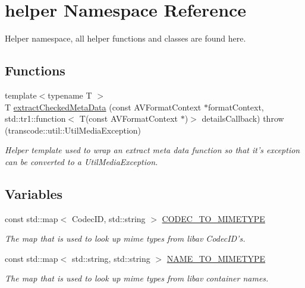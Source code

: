 \hypertarget{namespacehelper}{
\section{helper Namespace Reference}
\label{namespacehelper}
}


Helper namespace, all helper functions and classes are found here.  


\subsection*{Functions}
\begin{DoxyCompactItemize}
\item 
{\footnotesize template$<$typename T $>$ }\\T \hyperlink{namespacehelper_ac4210385b9f91f63e6a6c73cd4f15935}{extractCheckedMetaData} (const AVFormatContext $\ast$formatContext, std::tr1::function$<$ T(const AVFormatContext $\ast$)$>$ detailsCallback)  throw (transcode::util::UtilMediaException)
\begin{DoxyCompactList}\small\item\em Helper template used to wrap an extract meta data function so that it's exception can be converted to a UtilMediaException. \item\end{DoxyCompactList}\end{DoxyCompactItemize}
\subsection*{Variables}
\begin{DoxyCompactItemize}
\item 
const std::map$<$ CodecID, std::string $>$ \hyperlink{namespacehelper_af150f7275a50533efd1065e69614c1b7}{CODEC\_\-TO\_\-MIMETYPE}
\begin{DoxyCompactList}\small\item\em The map that is used to look up mime types from libav CodecID's. \item\end{DoxyCompactList}\item 
const std::map$<$ std::string, std::string $>$ \hyperlink{namespacehelper_ac0fdcb6f95d20f10e1ee9e9f8c9bd723}{NAME\_\-TO\_\-MIMETYPE}
\begin{DoxyCompactList}\small\item\em The map that is used to look up mime types from libav container names. \item\end{DoxyCompactList}\end{DoxyCompactItemize}


